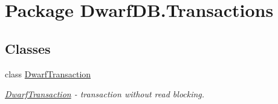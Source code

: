\hypertarget{namespace_dwarf_d_b_1_1_transactions}{
\section{Package DwarfDB.Transactions}
\label{namespace_dwarf_d_b_1_1_transactions}
}
\subsection*{Classes}
\begin{DoxyCompactItemize}
\item 
class \hyperlink{class_dwarf_d_b_1_1_transactions_1_1_dwarf_transaction}{DwarfTransaction}
\begin{DoxyCompactList}\small\item\em \hyperlink{class_dwarf_d_b_1_1_transactions_1_1_dwarf_transaction}{DwarfTransaction} -\/ transaction without read blocking. \item\end{DoxyCompactList}\end{DoxyCompactItemize}

